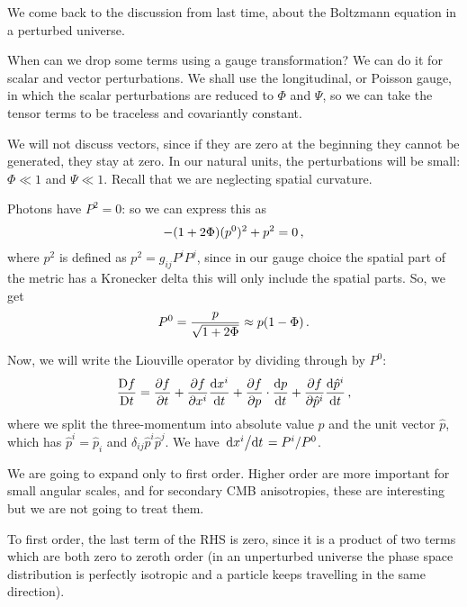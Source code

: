 \documentclass[main.tex]{subfiles}
\begin{document}

We come back to the discussion from last time, about the Boltzmann equation in a perturbed universe. 

When can we drop some terms using a gauge transformation? 
We can do it for scalar and vector perturbations. 
We shall use the longitudinal, or Poisson gauge, in which the scalar perturbations are reduced to \(\Phi \) and \(\Psi \), so we can take the tensor terms to be traceless and covariantly constant. 

We will not discuss vectors, since if they are zero at the beginning they cannot be generated, they stay at zero. 
In our natural units, the perturbations will be small: \(\Phi \ll 1\) and \(\Psi \ll 1\). 
Recall that we are neglecting spatial curvature. 

Photons have \(P^2=0\): so we can express this as 
%
\begin{align}
- \qty(1 + 2 \Phi ) (p^{0})^2 + p^2 =0 
\,,
\end{align}
%
where \(p^2\) is defined as \(p^2 = g_{ij} P^{i} P^{j}\),
since in our gauge choice the spatial part of the metric has a Kronecker delta this will only include the spatial parts. So, we get 
%
\begin{align}
P^{0} = \frac{p}{\sqrt{1 + 2 \Phi }} \approx p \qty(1 - \Phi )
\,.
\end{align}

Now, we will write the Liouville operator by dividing through by \(P^{0}\):
%
\begin{align}
\frac{\mathrm{D}f}{\mathrm{D}t }
= \pdv{f}{t} + \pdv{f}{x^{i}} \dv{x^{i}}{t} 
+ \pdv{f}{p} \cdot \dv{p}{t}
+ \pdv{f}{\hat{p}^{i}} \dv{\hat{p}^{i}}{t}
\,,
\end{align}
%
where we split the three-momentum into absolute value \(p\) and the unit vector \(\hat{p}\), which has \(\hat{p}^{i} = \hat{p}_{i}\) and \(\delta_{ij} \hat{p}^{i} \hat{p}^{j}\). 
We have \(\dv*{x^{i}}{t} = P^{i} / P^{0}\). 

We are going to expand only to first order. Higher order are more important for small angular scales, and for secondary CMB anisotropies, these are interesting but we are not going to treat them. 

To first order, the last term of the RHS is zero, since it is a product of two terms which are both zero to zeroth order (in an unperturbed universe the phase space distribution is perfectly isotropic and a particle keeps travelling in the same direction).
\end{document}
